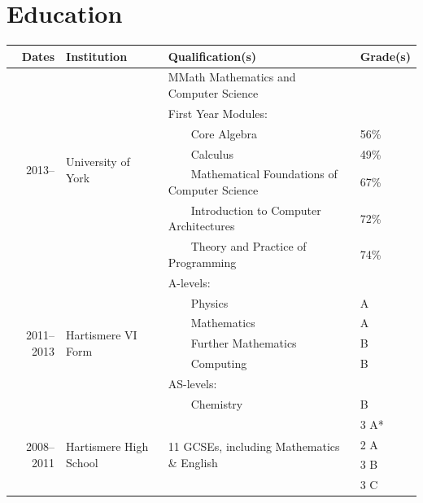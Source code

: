 \documentclass[11pt,a4paper]{article}
\begin{document}
\section*{Education}
\begin{tabular}{r | l | l | l}
  Dates                       & Institution
  & Qualification(s)                                            & Grade(s) \\ \hline
  \multirow{7}{*}{2013--}     & \multirow{7}{*}{University of York}
  & MMath Mathematics and Computer Science                      &      \\
                              &
  & First Year Modules:                                         &      \\
                              &
  & ~~~~Core Algebra                                            & 56\% \\
                              & 
  & ~~~~Calculus                                                & 49\% \\
                              & 
  & ~~~~Mathematical Foundations of Computer Science            & 67\% \\
                              & 
  & ~~~~Introduction to Computer Architectures                  & 72\% \\
                              &
  & ~~~~Theory and Practice of Programming                      & 74\% \\ \hline
  \multirow{7}{*}{2011--2013} & \multirow{7}{*}{Hartismere VI Form}
  & A-levels:                                                   &   \\
                              &
  & ~~~~Physics                                                 & A \\
                              & 
  & ~~~~Mathematics                                             & A \\
                              &
  & ~~~~Further Mathematics                                     & B \\
                              &
  & ~~~~Computing                                               & B \\
                              &
  & AS-levels:                                                  &   \\
                              &
  & ~~~~Chemistry                                               & B \\   \hline
  \multirow{4}{*}{2008--2011} & \multirow{4}{*}{Hartismere High School}
  & \multirow{4}{*}{11 GCSEs, including Mathematics \& English} & 3 A* \\
                              &
  &                                                             & 2 A  \\
                              & 
  &                                                             & 3 B  \\
                              &
  &                                                             & 3 C  \\
\end{tabular}
\end{document}
